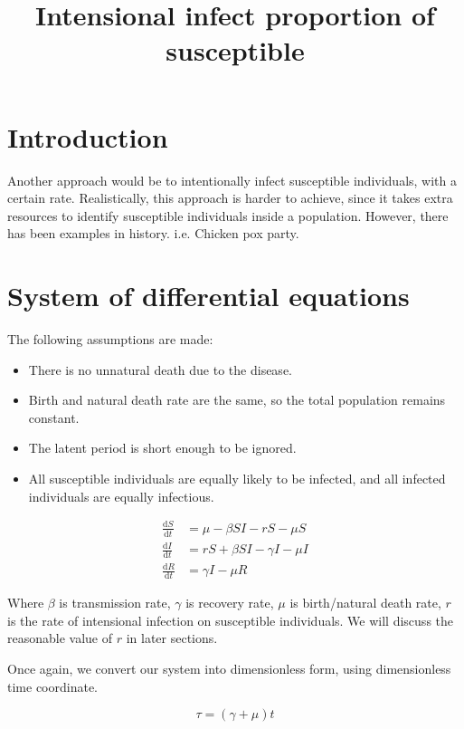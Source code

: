 \documentclass[12pt]{article}
\title{Intensional infect proportion of susceptible}
\newcommand\dbyd[2]{\frac{\mathrm d{#1}}{\mathrm d{#2}}}
\begin{document}
\maketitle
\section{Introduction}
Another approach would be to intentionally infect susceptible individuals, with a certain rate. Realistically, this approach is harder to achieve, since it takes extra resources to identify susceptible individuals inside a population. However, there has been examples in history. i.e. Chicken pox party.

\section{System of differential equations}
The following assumptions are made:
\begin{itemize}
\item There is no unnatural death due to the disease.
\item Birth and natural death rate are the same, so the total population remains constant.
\item The latent period is short enough to be ignored.
\item All susceptible individuals are equally likely to be infected, and all infected individuals are equally infectious.
\end{itemize}

\begin{equation}\label{1}
\begin{split}
\dbyd{S}{t}&=\mu- \beta SI-rS-\mu S \\
\dbyd{I}{t}&=rS+\beta SI-\gamma I -\mu I\\
\dbyd{R}{t}&=\gamma I-\mu R
\end{split}
\end{equation}

Where $\beta$ is transmission rate, $\gamma$ is recovery rate, $\mu$ is birth/natural death rate, $r$ is the rate of intensional infection on susceptible individuals. We will discuss the reasonable value of $r$ in later sections.

Once again, we convert our system into dimensionless form, using dimensionless time coordinate.

\begin{equation}
\tau=(\gamma+\mu)t
\end{equation}
\end{document}
